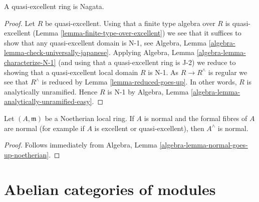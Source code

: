 \begin{lemma}
\label{lemma-quasi-excellent-nagata}
A quasi-excellent ring is Nagata.
\end{lemma}

\begin{proof}
Let $R$ be quasi-excellent.
Using that a finite type algebra over $R$ is quasi-excellent
(Lemma \ref{lemma-finite-type-over-excellent}) we see that
it suffices to show that any quasi-excellent domain is N-1, see
Algebra, Lemma \ref{algebra-lemma-check-universally-japanese}.
Applying Algebra, Lemma \ref{algebra-lemma-characterize-N-1}
(and using that a quasi-excellent ring is J-2) we reduce
to showing that a quasi-excellent local domain $R$ is N-1.
As $R \to R^\wedge$ is regular we see that $R^\wedge$
is reduced by Lemma \ref{lemma-reduced-goes-up}.
In other words, $R$ is analytically unramified.
Hence $R$ is N-1 by
Algebra, Lemma \ref{algebra-lemma-analytically-unramified-easy}.
\end{proof}

\begin{lemma}
\label{lemma-completion-normal-local-ring}
Let $(A, \mathfrak m)$ be a Noetherian local ring. If $A$ is normal
and the formal fibres of $A$ are normal (for example if $A$
is excellent or quasi-excellent), then $A^\wedge$ is normal.
\end{lemma}

\begin{proof}
Follows immediately from
Algebra, Lemma \ref{algebra-lemma-normal-goes-up-noetherian}.
\end{proof}





\section{Abelian categories of modules}
\label{section-abelian-categories-modules}

